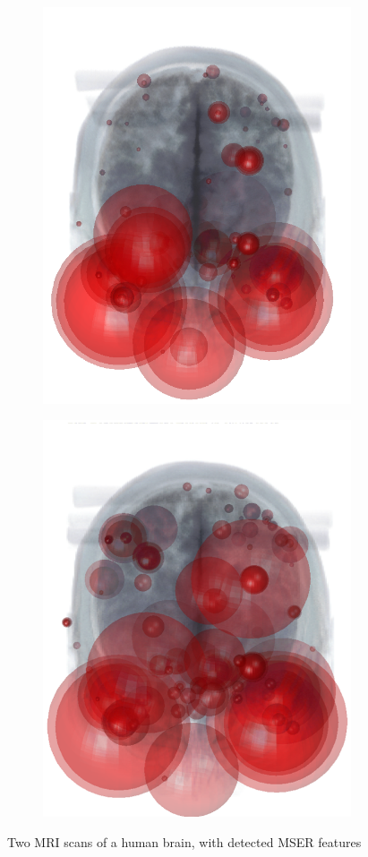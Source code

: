 \begin{figure}[ht]
	\centering 
	\begin{subfigure}[t]{0.35\linewidth} \centering 
		\includegraphics[width=0.8\linewidth]{./fig/eval/mri.png}
		\label{fig/eval/mri1}
	\end{subfigure}
	\begin{subfigure}[t]{0.35\linewidth} \centering 
		\includegraphics[width=0.8\linewidth]{./fig/eval/mri2.png}
		\label{fig/eval/mri2}
	\end{subfigure}
	\caption{Two MRI scans of a human brain, with detected MSER features}
	\label{fig/eval/mri}
\end{figure}

